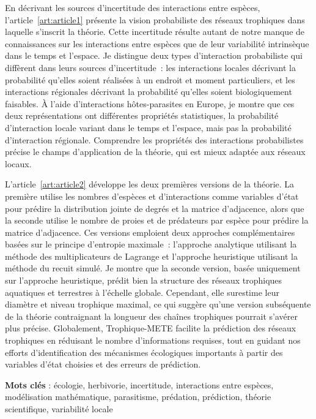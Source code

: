 \documentclass[12pt,twoside,phd]{dms}
\numberwithin{equation}{section}
\numberwithin{table}{chapter}
\numberwithin{figure}{chapter}
\begin{document}
En décrivant les sources d'incertitude des interactions entre espèces,
l'article~\ref{art:article1} présente la vision probabiliste des réseaux
trophiques dans laquelle s'inscrit la théorie. Cette incertitude résulte autant
de notre manque de connaissances sur les interactions entre espèces que de leur
variabilité intrinsèque dans le temps et l'espace. Je distingue deux types
d'interaction probabiliste qui diffèrent dans leurs sources d'incertitude~: les
interactions locales décrivant la probabilité qu'elles soient réalisées à un
endroit et moment particuliers, et les interactions régionales décrivant la
probabilité qu'elles soient biologiquement faisables. À l'aide d'interactions
hôtes-parasites en Europe, je montre que ces deux représentations ont
différentes propriétés statistiques, la probabilité d'interaction locale variant
dans le temps et l'espace, mais pas la probabilité d'interaction régionale.
Comprendre les propriétés des interactions probabilistes précise le champs
d'application de la théorie, qui est mieux adaptée aux réseaux locaux.

L'article~\ref{art:article2} développe les deux premières versions de la
théorie. La première utilise les nombres d'espèces et d'interactions comme
variables d'état pour prédire la distribution jointe de degrés et la matrice
d'adjacence, alors que la seconde utilise le nombre de proies et de prédateurs
par espèce pour prédire la matrice d'adjacence. Ces versions emploient deux
approches complémentaires basées sur le principe d'entropie maximale~:
l'approche analytique utilisant la méthode des multiplicateurs de Lagrange et
l'approche heuristique utilisant la méthode du recuit simulé. Je montre que la
seconde version, basée uniquement sur l'approche heuristique, prédit bien la
structure des réseaux trophiques aquatiques et terrestres à l'échelle globale.
Cependant, elle surestime leur diamètre et niveau trophique maximal, ce qui
suggère qu'une version subséquente de la théorie contraignant la longueur des
chaînes trophiques pourrait s'avérer plus précise. Globalement, Trophique-METE
facilite la prédiction des réseaux trophiques en réduisant le nombre
d'informations requises, tout en guidant nos efforts d'identification des
mécanismes écologiques importants à partir des variables d'état choisies et des
erreurs de prédiction.

\textbf{Mots clés} : écologie, herbivorie, incertitude, interactions entre
espèces, modélisation mathématique, parasitisme, prédation, prédiction, théorie
scientifique, variabilité locale  
\end{document}
